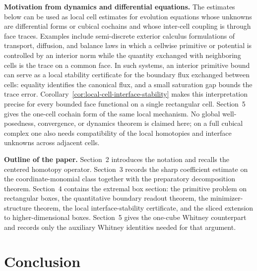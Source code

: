 \documentclass[11pt,letterpaper]{article}
\numberwithin{equation}{section}
\theoremstyle{plain}
\theoremstyle{definition}
\theoremstyle{remark}
\begin{document}
\medskip
\noindent\textbf{Motivation from dynamics and differential equations.}
The estimates below can be used as local cell estimates for evolution equations whose
unknowns are differential forms or cubical cochains and whose inter-cell
coupling is through face traces. Examples include semi-discrete exterior
calculus formulations of transport, diffusion, and balance laws in which a
cellwise primitive or potential is controlled by an interior norm while the
quantity exchanged with neighboring cells is the trace on a common face. In such
systems, an interior primitive bound can serve as a local stability certificate
for the boundary flux exchanged between cells: equality identifies the canonical
flux, and a small saturation gap bounds the trace error. Corollary~\ref{cor:local-cell-interface-stability}
makes this interpretation precise for every bounded face functional on a single
rectangular cell. Section~5 gives the one-cell cochain form of the same local
mechanism. No global well-posedness, convergence, or dynamics theorem is claimed
here; on a full cubical complex one also needs compatibility of the local
homotopies and interface unknowns across adjacent cells.

\medskip
\noindent\textbf{Outline of the paper.}
Section~2 introduces the notation and recalls the centered homotopy operator.
Section~3 records the sharp coefficient estimate on the coordinate-monomial
class together with the preparatory decomposition theorem. Section~4 contains
the extremal box section: the primitive problem on rectangular boxes, the
quantitative boundary readout theorem, the minimizer-structure theorem, the
local interface-stability certificate, and the sliced extension to
higher-dimensional boxes. Section~5 gives the one-cube Whitney counterpart and
records only the auxiliary Whitney identities needed for that argument.














\section*{Conclusion}
\end{document}
